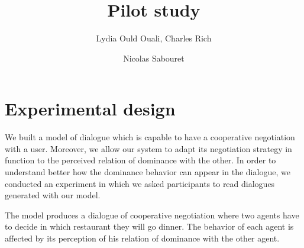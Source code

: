 \documentclass{llncs}
\begin{document}
\title{\vskip -10pt Pilot study}

\author{Lydia Ould Ouali, Charles Rich \and
Nicolas Sabouret }

\maketitle 


\section{Experimental design}
We built a model of dialogue which is capable to have a cooperative negotiation with a user. Moreover, we allow our system to adapt its negotiation strategy in function to the perceived relation of dominance with the other. 
In order to understand better how the dominance behavior can appear in the dialogue, we conducted an experiment in which we asked participants to read dialogues generated with our model.  


The model produces a dialogue of cooperative negotiation where two agents have to decide in which restaurant they will go dinner. The behavior of each agent is affected by its perception of his relation of dominance with the other agent.
\end{document}
